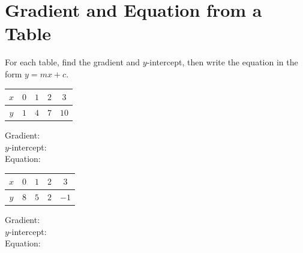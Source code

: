 \documentclass[11pt]{article}
\newcommand{\ans}{\hrulefill}
\begin{document}
\section{Gradient and Equation from a Table}
\noindent For each table, find the gradient and $y$-intercept, then write the equation in the form $y=mx+c$.

\begin{center}
\begin{minipage}{0.47\linewidth}
\centering
\begin{tabular}{|c|c|c|c|c|}
\hline
$x$ & $0$ & $1$ & $2$ & $3$ \\\hline
$y$ & $1$ & $4$ & $7$ & $10$ \\\hline
\end{tabular}

\vspace{0.6em}
Gradient: \ans \\[0.4em]
$y$-intercept: \ans \\[0.4em]
Equation: \ans
\end{minipage}
\hfill
\begin{minipage}{0.47\linewidth}
\centering
\begin{tabular}{|c|c|c|c|c|}
\hline
$x$ & $0$ & $1$ & $2$ & $3$ \\\hline
$y$ & $8$ & $5$ & $2$ & $-1$ \\\hline
\end{tabular}

\vspace{0.6em}
Gradient: \ans \\[0.4em]
$y$-intercept: \ans \\[0.4em]
Equation: \ans
\end{minipage}
\end{center}
\end{document}
